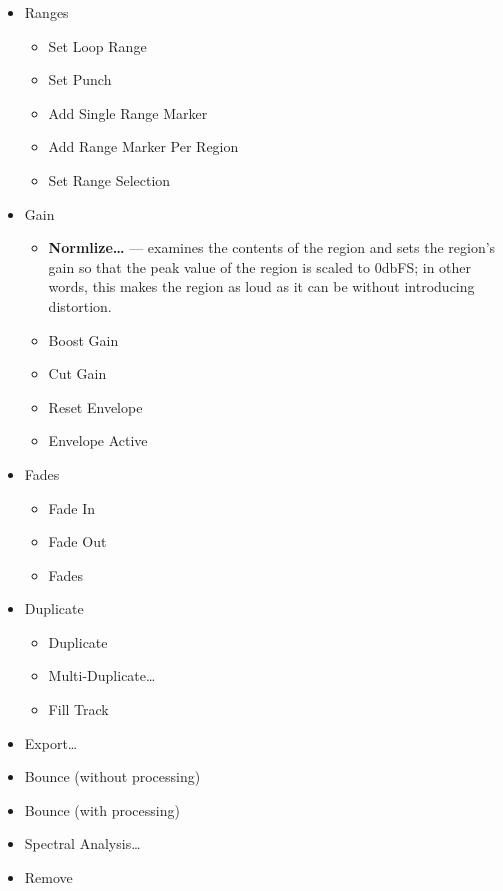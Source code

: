 \documentclass[10pt,a4paper]{book}
\begin{document}
{\begin{itemize}
\begin{itemize}
\item \textbf{Raise to Top} --- moves the region to the top layer of
  the stack.
\item \textbf{Raise} --- moves the region one step closer to the top
  of the stack.
\item \textbf{Lower} --- moves the region one step closer to the
  bottom of the stack.
\item \textbf{Lower to Bottom} --- moves the region to the bottom
  layer of the stack.
\end{itemize}
\item Ranges
\begin{itemize}
\item Set Loop Range
\item Set Punch
\item Add Single Range Marker
\item Add Range Marker Per Region
\item Set Range Selection
\end{itemize}
\item Gain
\begin{itemize}
\item \textbf{Normlize\ldots} --- examines the contents of the region
  and sets the region's gain so that the peak value of the region is
  scaled to 0dbFS; in other words, this makes the region as loud as it
  can be without introducing distortion.
\item Boost Gain
\item Cut Gain
\item Reset Envelope
\item Envelope Active
\end{itemize}
\item Fades
\begin{itemize}
\item Fade In
\item Fade Out
\item Fades
\end{itemize}
\item Duplicate
\begin{itemize}
\item Duplicate
\item Multi-Duplicate\ldots
\item Fill Track
\end{itemize}
\item Export\ldots
\item Bounce (without processing)
\item Bounce (with processing)
\item Spectral Analysis\ldots
\item Remove
\end{itemize}






}
\end{document}
